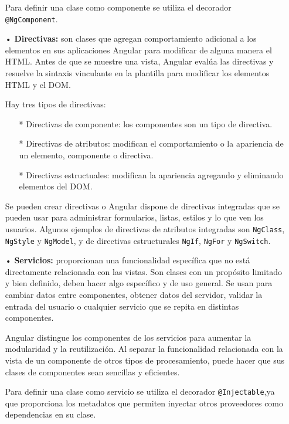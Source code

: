 \documentclass[a4paper, 12pt]{book}
\begin{document}
\begin{itemize}
	Para definir una clase como componente se utiliza el decorador \texttt{@NgComponent}.
	
	\item[•] \textbf{Directivas:} son clases que agregan comportamiento adicional a los elementos en sus aplicaciones Angular para modificar de alguna manera el HTML. Antes de que se muestre una vista, Angular evalúa las directivas y resuelve la sintaxis vinculante en la plantilla para modificar los elementos HTML y el DOM.
	
	Hay tres tipos de directivas:
	
	\begin{itemize}
	\item[*] Directivas de componente: los componentes son un tipo de directiva.
	\item[*] Directivas de atributos: modifican el comportamiento o la apariencia de un elemento, componente o directiva.
	\item[*] Directivas estructuales: modifican la apariencia agregando y eliminando elementos del DOM.
	\end{itemize}
	
	Se pueden crear directivas o Angular dispone de directivas integradas que se pueden usar para administrar formularios, listas, estilos y lo que ven los usuarios. Algunos ejemplos de directivas de atributos integradas son \texttt{NgClass}, \texttt{NgStyle} y \texttt{NgModel}, y de directivas estructurales \texttt{NgIf}, \texttt{NgFor} y \texttt{NgSwitch}.
	
	\item[•] \textbf{Servicios:} proporcionan una funcionalidad específica que no está directamente relacionada con las vistas. Son clases con un propósito limitado y bien definido, deben hacer algo específico y de uso general. Se usan para cambiar datos entre componentes, obtener datos del servidor, validar la entrada del usuario o cualquier servicio que se repita en distintas componentes.
	
	Angular distingue los componentes de los servicios para aumentar la modularidad y la reutilización. Al separar la funcionalidad relacionada con la vista de un componente de otros tipos de procesamiento, puede hacer que sus clases de componentes sean sencillas y eficientes.
	
	Para definir una clase como servicio se utiliza el decorador \texttt{@Injectable},ya que proporciona los metadatos que permiten inyectar otros proveedores como dependencias en su clase.
	
\end{itemize}
\end{document}
